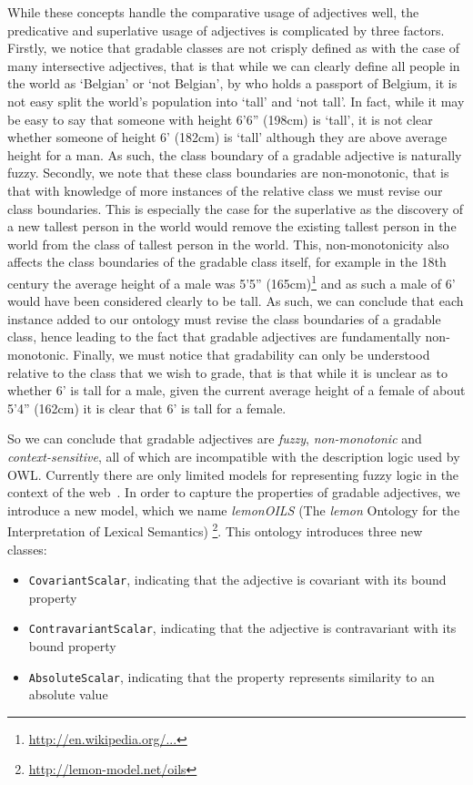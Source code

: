 \documentclass[11pt]{article}
\begin{document}
While these concepts handle the comparative usage of adjectives well, the 
predicative and superlative usage of adjectives is complicated by three factors. 
Firstly, we notice that gradable classes are not 
crisply defined as with the case of many intersective adjectives, that is that 
while we can clearly define all people in the world as `Belgian' or 
`not Belgian', by who holds a passport of Belgium, it is not easy 
split the world's population into `tall' and `not tall'. In fact, while it may 
be easy to say that someone with height 6'6'' (198cm) is `tall', it is not clear 
whether someone of height 6' (182cm) is `tall' although they are above average 
height for a man. As such, the class boundary of a gradable adjective is 
naturally fuzzy. Secondly, we note that these class boundaries are 
non-monotonic, that is that with knowledge of more instances of the relative 
class we must revise our class boundaries. This is especially the case for the
superlative as the discovery of a new tallest person in the world would remove 
the existing tallest person in the world from the class of tallest person in the 
world. This, non-monotonicity also affects the class boundaries of the gradable 
class itself, for example in the 18th century the average height of a male was 
5'5'' (165cm)\footnote{\url{http://en.wikipedia.org/...}}
and as such a male of 6' would have been considered clearly to be 
tall. As such, we can conclude that each instance added to our ontology must 
revise the class boundaries of a gradable class, hence leading to the fact that 
gradable adjectives are fundamentally non-monotonic. Finally, we must notice 
that gradability can only be understood relative to the class that we wish to 
grade, that is that while it is unclear as to whether 6' is tall for a male, 
given the current average height of a female of about 5'4'' (162cm) it is clear 
that 6' is tall for a female.

So we can conclude that gradable adjectives are \emph{fuzzy}, \emph{non-monotonic} 
and \emph{context-sensitive}, all of which are incompatible with the description 
logic used by OWL. Currently there are only limited models for representing fuzzy 
logic in the context of the web~\cite{zhao2008uncertainty}. In order to capture the 
properties of gradable adjectives, we introduce a new model, which we name 
\emph{lemonOILS} (The \emph{lemon} Ontology for the Interpretation of Lexical Semantics)
\footnote{\url{http://lemon-model.net/oils}}. This ontology introduces three 
new classes:

\begin{itemize}
	\item {\tt CovariantScalar}, indicating that the adjective is covariant with its bound property
	\item {\tt ContravariantScalar}, indicating that the adjective is contravariant with its bound property
	\item {\tt AbsoluteScalar}, indicating that the property represents similarity to an absolute value
\end{itemize}
\end{document}
